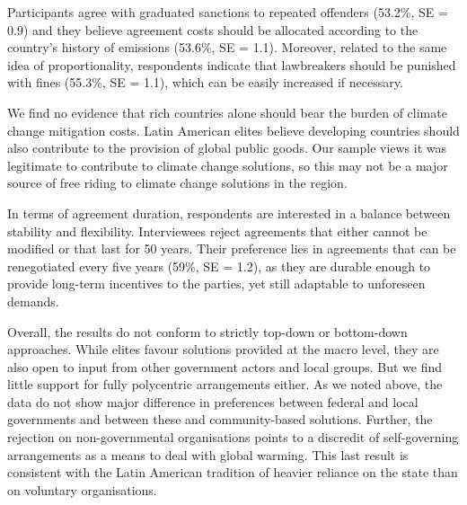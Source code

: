 \documentclass[a4paper,12pt]{article}
\begin{document}
Participants agree with graduated sanctions to repeated offenders (53.2\%, SE = 0.9) and they believe agreement costs should be allocated according to the country's history of emissions (53.6\%, SE = 1.1). Moreover, related to the same idea of proportionality, respondents indicate that lawbreakers should be punished with fines (55.3\%, SE = 1.1), which can be easily increased if necessary.

We find no evidence that rich countries alone should bear the burden of climate change mitigation costs. Latin American elites believe developing countries should also contribute to the provision of global public goods. Our sample views it was legitimate to contribute to climate change solutions, so this may not be a major source of free riding to climate change solutions in the region.

In terms of agreement duration, respondents are interested in a balance between stability and flexibility. Interviewees reject agreements that either cannot be modified or that last for 50 years. Their preference lies in agreements that can be renegotiated every five years (59\%, SE = 1.2), as they are durable enough to provide long-term incentives to the parties, yet still adaptable to unforeseen demands.

Overall, the results do not conform to strictly top-down or bottom-down approaches. While elites favour solutions provided at the macro level, they are also open to input from other government actors and local groups. But we find little support for fully polycentric arrangements either. As we noted above, the data do not show major difference in preferences between federal and local governments and between these and community-based solutions. Further, the rejection on non-governmental organisations points to a discredit of self-governing arrangements as a means to deal with global warming. This last result is consistent with the Latin American tradition of heavier reliance on the state than on voluntary organisations.
\end{document}
